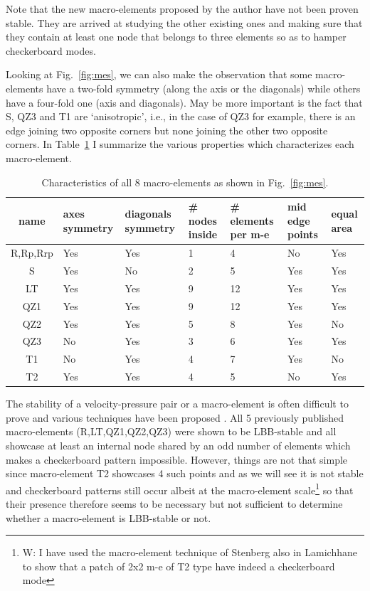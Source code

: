 \documentclass[a4paper,12pt]{article}
\begin{document}
Note that the new macro-elements proposed by the author have not been proven stable. They are arrived at 
studying the other existing ones and making sure that they contain at least one node that belongs to three 
elements so as to hamper checkerboard modes.


Looking  at Fig.~\ref{fig:mes}, we can also make the observation that some macro-elements 
have a two-fold symmetry (along the axis or the diagonals) while others have a four-fold one 
(axis and diagonals). May be more important is the fact that S, QZ3 and T1 are `anisotropic', i.e., in 
the case of QZ3 for example, there is an edge joining two opposite corners but none joining the 
other two opposite corners.
In Table~\ref{tab1} I summarize the various properties which characterizes each macro-element.

\begin{table}
\centering
\begin{tabular}{cp{2cm}p{2cm}p{2.5cm}p{2cm}p{2cm}p{2cm}}
\hline
{name} & {axes symmetry}  & {diagonals symmetry} & {\# nodes inside} 
& {\# elements per m-e} & {mid edge points} & equal area \\
\hline
\hline
R,Rp,Rrp   &  Yes &  Yes & 1  & 4 & No  & Yes\\
S   &  Yes &   No & 2  & 5 & Yes & Yes\\
LT  &  Yes &  Yes & 9 & 12 & Yes & Yes\\
QZ1 &  Yes &  Yes & 9 & 12 & Yes & Yes\\
QZ2 &  Yes &  Yes & 5 & 8  & Yes & No\\
QZ3 &  No  &  Yes & 3 & 6  & Yes & Yes\\
T1  &  No  &  Yes & 4 & 7  & Yes & No\\
T2  &  Yes &  Yes & 4 & 5  & No  & Yes\\
\hline
\end{tabular}
\caption{Characteristics of all 8 macro-elements as shown in Fig.~\ref{fig:mes}.\label{tab1}}%
\end{table}

The stability of a velocity-pressure pair or a macro-element is often difficult to prove 
and various techniques have been proposed \cite{bobf13}. 
All 5 previously published macro-elements (R,LT,QZ1,QZ2,QZ3) were shown to be LBB-stable and all showcase at least 
an internal node shared by an odd number of elements which makes a checkerboard pattern impossible. 
However, things are not that simple since macro-element T2 showcases 
4 such points and as we will see it is not stable and checkerboard patterns still occur 
albeit at the macro-element scale\footnote{W: I have used the macro-element technique of Stenberg 
also in Lamichhane to show that a patch of 2x2 m-e of T2 type have indeed a checkerboard mode} 
so that their presence therefore seems to be necessary but not sufficient to determine whether 
a macro-element is LBB-stable or not. 
\end{document}
